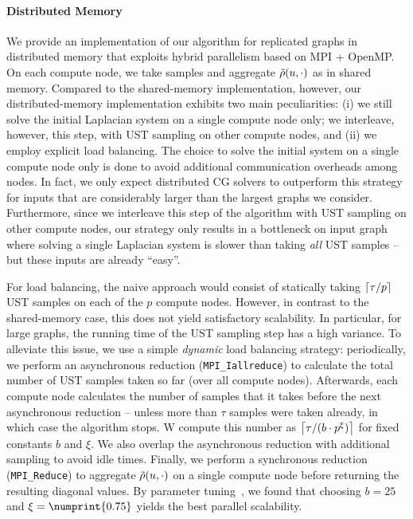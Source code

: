 \paragraph{Distributed Memory}
We provide an implementation of our algorithm for replicated graphs in distributed memory that
exploits hybrid parallelism based on MPI + OpenMP. On each compute node, we take samples and
aggregate $\tilde{\rho}(u, \cdot)$ as in shared memory.
Compared to the shared-memory implementation, however, our distributed-memory implementation
exhibits two main peculiarities: (i) we still solve the initial Laplacian system on a single
compute node only; we interleave, however, this step, with UST sampling on other compute nodes,
and (ii) we employ explicit load balancing. The choice to solve the initial system on a single
compute node only is done to avoid additional communication overheads among nodes. In fact,
we only expect distributed CG solvers to outperform this strategy for inputs that are considerably
larger than the largest graphs we consider. Furthermore, since we interleave this step of the
algorithm with UST sampling on other compute nodes, our strategy only results in a bottleneck on
input graph where solving a single Laplacian system is slower than taking \emph{all} UST samples
-- but these inputs are already \enquote{easy}.

For load balancing, the naive approach would consist of statically taking $\ceil{\tau/p}$ UST
samples on each of the $p$ compute nodes. However, in contrast to the shared-memory case,
this does not yield satisfactory scalability. In particular, for large graphs, the running time of
the UST sampling step has a high variance. To alleviate this issue, we use a simple \emph{dynamic}
load balancing strategy: periodically, we perform an asynchronous reduction (\texttt{MPI\_Iallreduce})
to calculate the total number of UST samples taken so far (over all compute nodes).
Afterwards, each compute node calculates the number of samples that it takes before the next asynchronous
reduction -- unless more than $\tau$ samples were taken already, in which case the algorithm stops.
W compute this number as $\ceil{\tau / (b\cdot p^{\xi})}$ for fixed constants $b$ and $\xi$.
We also overlap the asynchronous reduction with additional sampling to avoid idle times.
Finally, we perform a synchronous reduction (\texttt{MPI\_Reduce}) to aggregate
$\tilde{\rho}(u, \cdot)$ on a single compute node before returning the resulting diagonal values.
By parameter tuning~\cite{DBLP:journals/algorithms/AngrimanGLMNPT19}, we found that choosing
$b = 25$ and $\xi = \numprint{0.75}$ yields the best parallel scalability.


